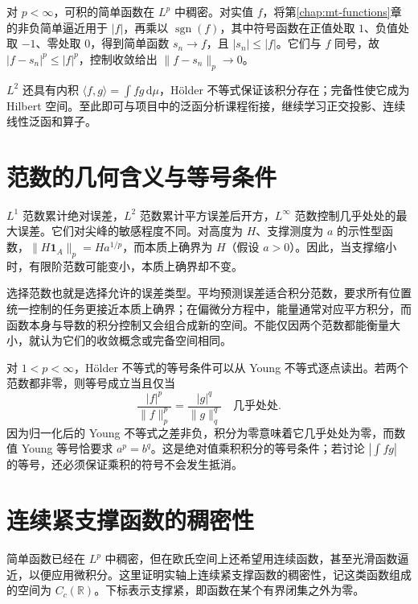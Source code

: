 对 $p<\infty$，可积的简单函数在 $L^p$ 中稠密。对实值 $f$，将第\ref{chap:mt-functions}章的非负简单逼近用于 $|f|$，再乘以 $\operatorname{sgn}(f)$，其中符号函数在正值处取 $1$、负值处取 $-1$、零处取 $0$，得到简单函数 $s_n\to f$，且 $|s_n|\leq|f|$。它们与 $f$ 同号，故 $|f-s_n|^p\leq|f|^p$，控制收敛给出 $\|f-s_n\|_p\to0$。

$L^2$ 还具有内积 $\langle f,g\rangle=\int fg\,\mathrm d\mu$，Hölder 不等式保证该积分存在；完备性使它成为 Hilbert 空间。至此即可与项目中的泛函分析课程衔接，继续学习正交投影、连续线性泛函和算子。

\section{范数的几何含义与等号条件}
$L^1$ 范数累计绝对误差，$L^2$ 范数累计平方误差后开方，$L^\infty$ 范数控制几乎处处的最大误差。它们对尖峰的敏感程度不同。对高度为 $H$、支撑测度为 $a$ 的示性型函数，$\|H\mathbf1_A\|_p=H a^{1/p}$，而本质上确界为 $H$（假设 $a>0$）。因此，当支撑缩小时，有限阶范数可能变小，本质上确界却不变。

选择范数也就是选择允许的误差类型。平均预测误差适合积分范数，要求所有位置统一控制的任务更接近本质上确界；在偏微分方程中，能量通常对应平方积分，而函数本身与导数的积分控制又会组合成新的空间。不能仅因两个范数都能衡量大小，就认为它们的收敛概念或完备空间相同。

对 $1<p<\infty$，Hölder 不等式的等号条件可以从 Young 不等式逐点读出。若两个范数都非零，则等号成立当且仅当
\[
 \frac{|f|^p}{\|f\|_p^p}=\frac{|g|^q}{\|g\|_q^q}
 \quad\text{几乎处处}.
\]
因为归一化后的 Young 不等式之差非负，积分为零意味着它几乎处处为零，而数值 Young 等号恰要求 $a^p=b^q$。这是绝对值乘积积分的等号条件；若讨论 $|\int fg|$ 的等号，还必须保证乘积的符号不会发生抵消。

\section{连续紧支撑函数的稠密性}
\label{sec:mt-continuous-density}
简单函数已经在 $L^p$ 中稠密，但在欧氏空间上还希望用连续函数，甚至光滑函数逼近，以便应用微积分。这里证明实轴上连续紧支撑函数的稠密性，记这类函数组成的空间为 $C_c(\mathbb R)$。下标表示支撑紧，即函数在某个有界闭集之外为零。

